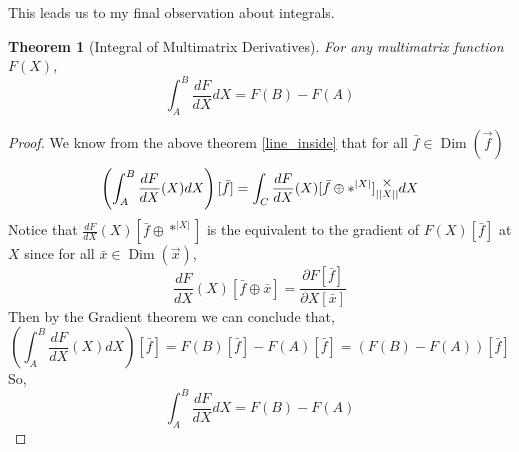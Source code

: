 \documentclass[12pt]{book}
\theoremstyle{plain}
\newtheorem{theorem}{Theorem}[chapter]
\theoremstyle{definition}
\theoremstyle{ppart}
\theoremstyle{case}
\theoremstyle{solution}
\DeclareMathOperator{\Dim}{Dim}
\newcommand{\mmult}[1]{\text{\raisebox{1ex}{$\underset{#1}{\times}$}}}
\newcommand{\shape}[1]{\left|#1\right|}
\begin{document}
This leads us to my final observation about integrals. 

\begin{theorem}[Integral of Multimatrix Derivatives]
For any multimatrix function $F(X)$,
\[ \int_A^B \frac{dF}{dX} dX = F(B) - F(A) \]
\end{theorem}
\begin{proof}
We know from the above theorem \ref{line_inside} that for all $\bar{f} \in \Dim(\vec{f})$
\[ \left(\int_A^B \frac{dF}{dX}(X) dX\right)[\bar{f}] = \int_C \frac{dF}{dX}(X)[\bar{f} \oplus *^{\shape{X}}] \mmult{\shape{\shape{X}}} dX \]
Notice that $\frac{dF}{dX}(X)[\bar{f} \oplus *^{\shape{X}}]$ is the equivalent
to the gradient of $F(X)[\bar{f}]$ at $X$ since for all $\bar{x} \in \Dim(\vec{x})$,
\[ \frac{dF}{dX}(X)[\bar{f} \oplus \bar{x}] = \frac{\partial F[\bar{f}]}{\partial X[\bar{x}]} \]
Then by the Gradient theorem \cite{wiki:gradient_thm} we can conclude that,
\[ \left(\int_A^B \frac{dF}{dX}(X) dX\right)[\bar{f}] =  F(B)[\bar{f}] - F(A)[\bar{f}] = \left( F(B)-F(A) \right)[\bar{f}] \]
So, 
\[ \int_A^B \frac{dF}{dX} dX = F(B) - F(A) \]
\end{proof}
\end{document}

